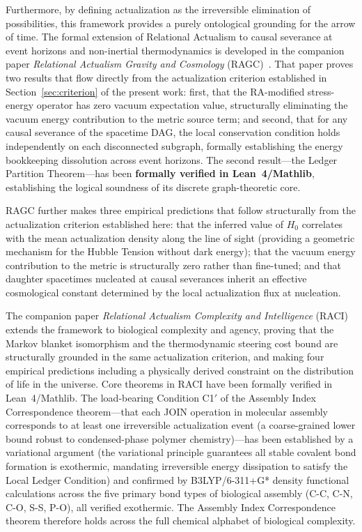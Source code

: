 \documentclass[11pt,a4paper]{article}
\theoremstyle{plain}
\theoremstyle{definition}
\theoremstyle{remark}
\begin{document}
Furthermore, by defining actualization as the irreversible elimination of
possibilities, this framework provides a purely ontological grounding for the arrow
of time. The formal extension of Relational Actualism to causal severance at event
horizons and non-inertial thermodynamics is developed in the companion paper
\emph{Relational Actualism Gravity and Cosmology} (RAGC)~\citep{Sandeman2026RAGC}.
That paper proves two results that flow directly from the actualization criterion
established in Section~\ref{sec:criterion} of the present work: first, that the
RA-modified stress-energy operator has zero vacuum expectation value, structurally
eliminating the vacuum energy contribution to the metric source term; and second,
that for any causal severance of the spacetime DAG, the local conservation
condition holds independently on each disconnected subgraph, formally establishing
the energy bookkeeping dissolution across event horizons. The second result---the
Ledger Partition Theorem---has been \textbf{formally verified in Lean~4/Mathlib},
establishing the logical soundness of its discrete graph-theoretic core.

RAGC further makes three empirical predictions that follow structurally from the
actualization criterion established here: that the inferred value of $H_0$
correlates with the mean actualization density along the line of sight (providing
a geometric mechanism for the Hubble Tension without dark energy); that the vacuum
energy contribution to the metric is structurally zero rather than fine-tuned; and
that daughter spacetimes nucleated at causal severances inherit an effective
cosmological constant determined by the local actualization flux at nucleation.

The companion paper \emph{Relational Actualism Complexity and Intelligence}
(RACI)~\citep{Sandeman2026RACI} extends the framework to biological complexity and
agency, proving that the Markov blanket isomorphism and the thermodynamic steering
cost bound are structurally grounded in the same actualization criterion, and
making four empirical predictions including a physically derived constraint on the
distribution of life in the universe. Core theorems in RACI have been formally
verified in Lean~4/Mathlib. The load-bearing Condition C1$'$ of the Assembly Index
Correspondence theorem---that each JOIN operation in molecular assembly corresponds
to at least one irreversible actualization event (a coarse-grained lower bound
robust to condensed-phase polymer chemistry)---has been established by a variational
argument (the variational principle guarantees all stable covalent bond formation is
exothermic, mandating irreversible energy dissipation to satisfy the Local Ledger
Condition) and confirmed by B3LYP/6-311+G* density functional calculations across
the five primary bond types of biological assembly (C-C, C-N, C-O, S-S, P-O), all
verified exothermic. The Assembly Index Correspondence theorem therefore holds
across the full chemical alphabet of biological complexity.
\end{document}
